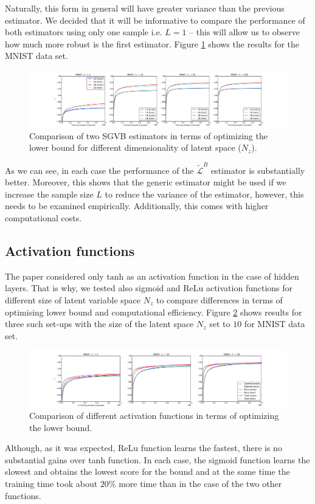 \documentclass[../report/report.tex]{subfiles}
\begin{document}
Naturally, this form in general will have greater variance than the previous estimator. We decided that it will be informative to compare the performance of both estimators using only one sample i.e. $L=1$ -- this will allow us to observe how much more robust is the first estimator. Figure \ref{fig:mnist_LAvsLB} shows the results for the MNIST data set.

\begin{figure}[!htb]
\centering
\includegraphics[width=0.8\linewidth]{../../res/mnist_LAvsLB}

  \caption[1]{Comparison of two SGVB estimators in terms of optimizing the lower bound for different dimensionality of latent space ($N_z$). }
  \label{fig:mnist_LAvsLB}
\end{figure}

As we can see, in each case the performance of the $\widetilde{\mathcal{L}}^{B}$ estimator is substantially better. Moreover, this shows that the generic estimator might be used if we increase the sample size $L$ to reduce the variance of the estimator, however, this needs to be examined empirically. Additionally, this comes with higher computational costs.

\subsection{Activation functions}
The paper considered only $\text{tanh}$ as an activation function in the case of hidden layers. That is why, we tested also sigmoid and ReLu activation functions for different size of latent variable space $N_z$ to compare differences in terms of optimising lower bound and computational efficiency. Figure \ref{fig:mnist_activation} shows results for three such set-ups with the size of the latent space  $N_z$ set to $10$ for MNIST data set.

\begin{figure}[!htb]
\centering
\includegraphics[width=0.8\linewidth]{../../res/mnist_activations}
  \caption[1]{Comparison of different activation functions in terms of optimizing the lower bound. }
\label{fig:mnist_activation}
\end{figure}

Although, as it was expected, ReLu function learns the fastest, there is no substantial gains over tanh function. In each case, the sigmoid function learns the slowest and obtains the lowest score for the bound and at the same time the training time took about $20\%$ more time than in the case of the two other functions.
\end{document}
